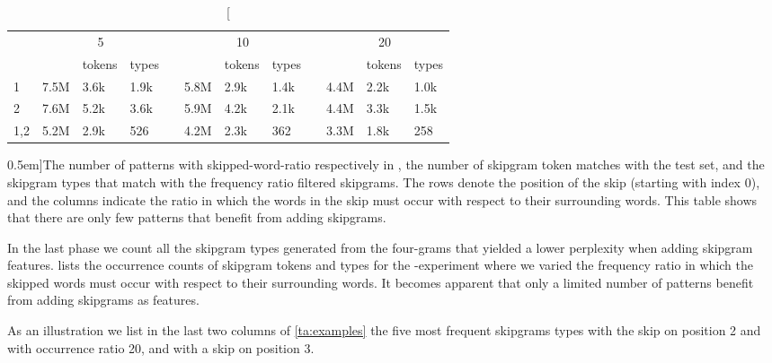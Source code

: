\begin{table*}
	\begin{center}
		\begin{tabular}{l*{3}{l}l*{3}{l}l*{3}{l}}
			& \multicolumn{3}{c}{5} & & \multicolumn{3}{c}{10} & & \multicolumn{3}{c}{20} \\
			& \obw & tokens & types & & \obw & tokens & types & & \obw & tokens & types \\
			\cline{2-4}\cline{6-8}\cline{10-12}
			1 & 7.5M & 3.6k & 1.9k & & 5.8M & 2.9k & 1.4k & & 4.4M & 2.2k & 1.0k \\
			2 & 7.6M & 5.2k & 3.6k & & 5.9M & 4.2k & 2.1k & & 4.4M & 3.3k & 1.5k \\
			1,2 & 5.2M & 2.9k & 526 & & 4.2M & 2.3k & 362 & & 3.3M & 1.8k & 258 \\
		\end{tabular}
		\caption[][0.5em]{The number of patterns with skipped-word-ratio respectively in \obw, the number of skipgram token matches with the \emea test set, and the skipgram types that match with the frequency ratio filtered skipgrams. The rows denote the position of the skip (starting with index $0$), and the columns indicate the ratio in which the words in the skip must occur with respect to their surrounding words. This table shows that there are only few patterns that benefit from adding skipgrams.}\label{ta:skipratio}
	\end{center}
\end{table*}

In the last phase we count all the skipgram types generated from the four-grams that yielded a lower perplexity when adding skipgram features.  lists the occurrence counts of skipgram tokens and types for the \obw-\emea experiment where we varied the frequency ratio in which the skipped words must occur with respect to their surrounding words. It becomes apparent that only a limited number of patterns benefit from adding skipgrams as features.

As an illustration we list in the last two columns of \cref{ta:examples} the five most frequent skipgrams types with the skip on position 2 and with occurrence ratio 20, and with a skip on position 3.


